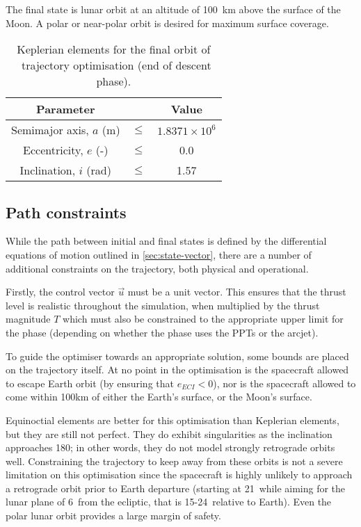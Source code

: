 The final state is lunar orbit at an altitude of 100~km above the surface of the Moon. A polar or near-polar orbit is desired for maximum surface coverage.

\begin{table}[h]
\caption{Keplerian elements for the final orbit of \BW\ trajectory optimisation (end of descent phase).} \label{tab:Phase-5-constraints}
\centering
\begin{tabular} {ccc}\toprule
Parameter && Value\\\midrule
Semimajor axis, $a$ (m) &$\le$& $1.8371\times 10^6$\\
Eccentricity, $e$ (-) &$\le$& 0.0\\
Inclination, $i$ (rad) &$\le$& 1.57\\\bottomrule
\end{tabular}
\end{table}

\subsection{Path constraints} \label{sub:Path-constraints}

While the path between initial and final states is defined by the differential equations of motion outlined in \autoref{sec:state-vector}, there are a number of additional constraints on the trajectory, both physical and operational.

Firstly, the control vector $\vec{u}$ must be a unit vector. This ensures that the thrust level is realistic throughout the simulation, when multiplied by the thrust magnitude $T$ which must also be constrained to the appropriate upper limit for the phase (depending on whether the phase uses the PPTs or the arcjet).

To guide the optimiser towards an appropriate solution, some bounds are placed on the trajectory itself. At no point in the optimisation is the spacecraft allowed to escape Earth orbit (by ensuring that $e_{ECI}<0$), nor is the spacecraft allowed to come within 100km of either the Earth's surface, or the Moon's surface.

Equinoctial elements are better for this optimisation than Keplerian elements, but they are still not perfect. They do exhibit singularities as the inclination approaches 180\degrees; in other words, they do not model strongly retrograde orbits well. Constraining the trajectory to keep away from these orbits is not a severe limitation on this optimisation since the spacecraft is highly unlikely to approach a retrograde orbit prior to Earth departure (starting at 21\degrees\ while aiming for the lunar plane of 6\degrees\ from the ecliptic, that is 15-24\degrees\ relative to Earth). Even the polar lunar orbit provides a large margin of safety.

